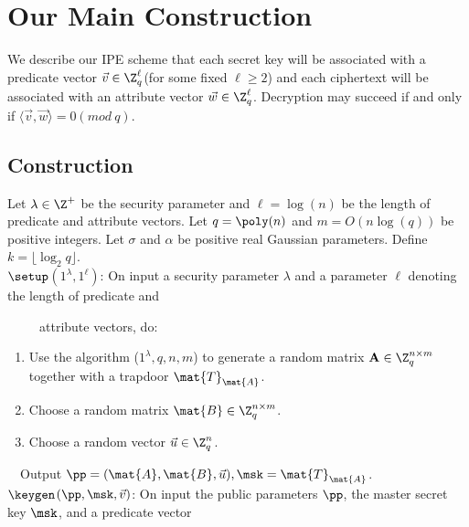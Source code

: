 \section{Our Main Construction}
We describe our IPE scheme that each secret key will be associated with a predicate vector $\vec{v} \in \Z^{\ell}_{q}$(for some fixed $\ell\geq 2$) and each ciphertext will be associated with an attribute vector $\vec{w} \in \Z^{\ell}_{q}$. Decryption may succeed if and only if $\langle \vec{v},\vec{w} \rangle=0 (mod\ q)$.
\subsection{Construction}
Let $\lambda \in \Z^{+}$ be the security parameter and $\ell=\log(n)$ be the length of predicate and attribute vectors. Let $q=\poly(n)$ and $m=O(n\log(q))$ be positive integers. Let $\sigma$ and $\alpha$ be positive real Gaussian parameters. Define $k=\lfloor \log_{2}q\rfloor$. \\[0.6cm]
$\setup$$(1^{\lambda},1^{\ell})$: On input a security parameter $\lambda$ and a parameter $\ell$ denoting the length of predicate and

~~~~~attribute vectors, do:
\begin{enumerate}
\item Use the algorithm \trapgen ($1^{\lambda},q,n,m$) to generate a random matrix $\textbf{A} \in \Z^{n \times m}_{q}$ together with a trapdoor $\mat{T}_\mat{A}$.\

\item Choose a random matrix $\mat{B} \in \Z^{n \times m}_{q}$.\

\item Choose a random vector $\vec{u} \in \Z^{n}_{q}$.
\end{enumerate}
~~Output $\pp=(\mat{A}, \mat{B}, \vec{u}),\msk=\mat{T}_\mat{A}$.\\[0.4cm]
$\keygen$$(\pp,\msk,\vec{v})$: On input the public parameters $\pp$, the master secret key $\msk$, and a predicate vector

